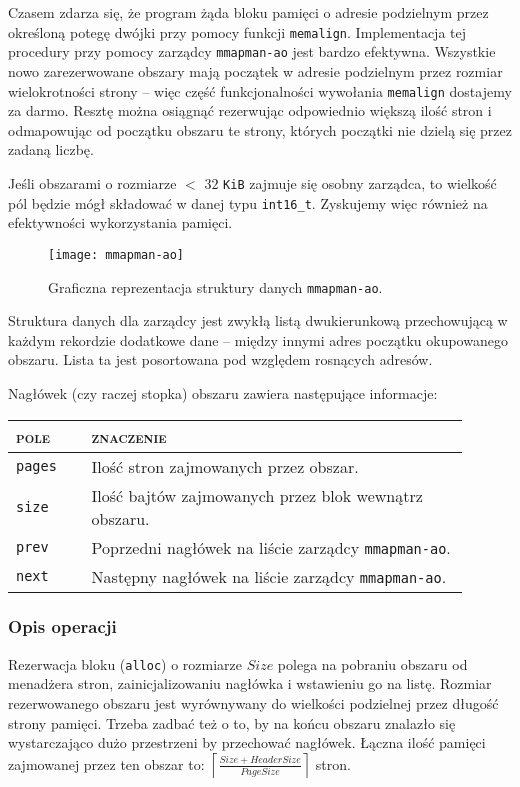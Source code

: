 \documentclass[12pt,a4paper,titlepage,twoside]{mwart}
\begin{document}
Czasem zdarza się, że program żąda bloku pamięci o adresie podzielnym przez
określoną potegę dwójki przy pomocy funkcji \verb+memalign+. Implementacja tej
procedury przy pomocy zarządcy \texttt{mmapman-ao} jest bardzo efektywna.
Wszystkie nowo zarezerwowane obszary mają początek w adresie podzielnym przez
rozmiar wielokrotności strony -- więc część funkcjonalności wywołania
\verb+memalign+ dostajemy za darmo. Resztę można osiągnąć rezerwując
odpowiednio większą ilość stron i odmapowując od początku obszaru te strony,
których początki nie dzielą się przez zadaną liczbę.

Jeśli obszarami o rozmiarze $<$ $32$ \verb+KiB+ zajmuje się osobny zarządca, to
wielkość pól będzie mógł składować w danej typu \verb+int16_t+. Zyskujemy więc
również na efektywności wykorzystania pamięci.

\begin{figure}[h]
\centering
\texttt{[image: mmapman-ao]}
\caption{Graficzna reprezentacja struktury danych \texttt{mmapman-ao}.}
\end{figure}

Struktura danych dla zarządcy jest zwykłą listą dwukierunkową przechowującą w
każdym rekordzie dodatkowe dane -- między innymi adres początku okupowanego
obszaru. Lista ta jest posortowana pod względem rosnących adresów.

Nagłówek (czy raczej stopka) obszaru zawiera następujące informacje:
\begin{center}
\begin{tabular}{|m{0.15\linewidth}|p{0.75\linewidth}|}
\hline
\textsc{pole} & \textsc{znaczenie} \\
\hline
\hline
\verb+pages+ & Ilość stron zajmowanych przez obszar. \\
\hline
\verb+size+	 & Ilość bajtów zajmowanych przez blok wewnątrz obszaru. \\
\hline
\verb+prev+	 & Poprzedni nagłówek na liście zarządcy \texttt{mmapman-ao}. \\
\hline
\verb+next+	 & Następny nagłówek na liście zarządcy \texttt{mmapman-ao}. \\
\hline
\end{tabular}
\end{center}

\subsubsection{Opis operacji}

Rezerwacja bloku (\verb+alloc+) o rozmiarze $Size$ polega na pobraniu obszaru od
menadżera stron, zainicjalizowaniu nagłówka i wstawieniu go na listę. Rozmiar
rezerwowanego obszaru jest wyrównywany do wielkości podzielnej przez długość
strony pamięci. Trzeba zadbać też o to, by na końcu obszaru znalazło się
wystarczająco dużo przestrzeni by przechować nagłówek. Łączna ilość pamięci
zajmowanej przez ten obszar to:
$\left\lceil\frac{Size + HeaderSize}{PageSize}\right\rceil$ stron.
\end{document}
